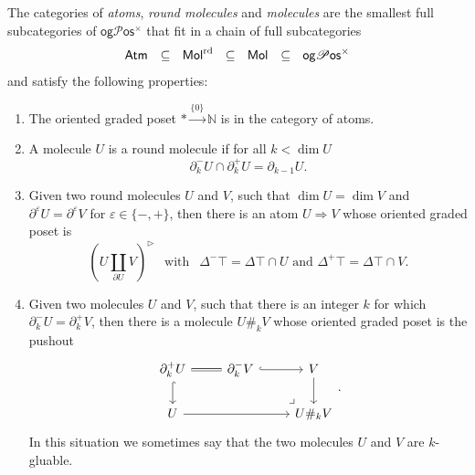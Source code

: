 \documentclass[12pt,a4paper]{article}
\numberwithin{equation}{section}
\newcommand{\atm}[2][s]{%
    \ifx b#1\mathsf{Atm}_{#2}\else
    \ifx s#1\mathsf{sAtm}_{#2}\else
    \ifx f#1\mathsf{sAtm}^{\mathrm{fa}}_{#2}\else
    \mathrm{Illegal~option}%
    \fi\fi\fi
}
\newcommand{\mol}[2][s]{%
    \ifx b#1\mathsf{Mol}_{#2}\else
    \ifx s#1\mathsf{sMol}_{#2}\else
    \ifx f#1\mathsf{sMol}^{\mathrm{fa}}_{#2}\else
    \mathrm{Illegal~option}%
    \fi\fi\fi
}
\newcommand{\ogpos}{\mathsf{og} \mathscr{P} \mathsf{os}^{\times}}
\begin{document}
\begin{definition}
    The categories of \emph{atoms}, \emph{round molecules} and \emph{molecules} are the smallest full subcategories of $\ogpos$ that fit in a chain of full subcategories
    \begin{equation}
        \atm[b]{} \ \ \subseteq \ \ \mol[b]{}^{\mathrm{rd}} \ \ \subseteq \ \ \mol[b]{} \ \ \subseteq \ \ \ogpos
    \end{equation}
    and satisfy the following properties:
    \begin{enumerate}
        \item The oriented graded poset $* \xrightarrow{\{ 0 \}} \mathbb{N}$ is in the category of atoms.
        \item A molecule $U$ is a round molecule if for all $k < \dim U$
        \begin{equation}
            \partial^-_k U \cap \partial^+_k U = \partial_{k - 1} U.
        \end{equation}
        \item Given two round molecules $U$ and $V$, such that $\dim U = \dim V$ and $\partial^{\varepsilon} U = \partial^{\varepsilon} V$ for $\varepsilon \in \{ -,+ \}$, then there is an atom $U \Rightarrow V$ whose oriented graded poset is 
        \begin{equation}
            (U \mathop{\amalg}_{\partial U} V)^{\vartriangleright} \ \ \text{ with } \ \ \Delta^- \top = \Delta \top \cap U \text{ and } \Delta^+ \top = \Delta \top \cap V.
        \end{equation}
        \item Given two molecules $U$ and $V$, such that there is an integer $k$ for which $\partial^-_k U = \partial^+_k V$, then there is a molecule $U \#_k V$ whose oriented graded poset is the pushout
        \begin{equation}
             \begin{tikzcd}
                 \partial^+_k U  \arrow[r, Rightarrow, no head] \arrow[d, hook] & \partial^-_k V \arrow[rd, phantom, very near end, "\lrcorner"] \arrow[r, hook] & V \arrow[d] \\
                 U \arrow[rr] & & U \#_k V
             \end{tikzcd}.
         \end{equation}
         In this situation we sometimes say that the two molecules $U$ and $V$ are $k$-gluable.
    \end{enumerate}
\end{definition}
\end{document}
